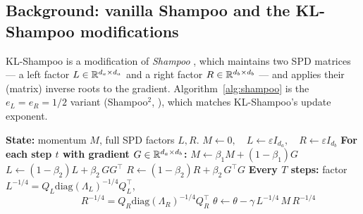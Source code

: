\subsection{Background: vanilla Shampoo and the KL-Shampoo modifications}
\label{sec:shampoo-background}

KL-Shampoo is a modification of \emph{Shampoo} \citep{gupta2018shampoo}, which
maintains two SPD matrices --- a left factor $L\in\mathbb{R}^{d_a\times d_a}$ and a
right factor $R\in\mathbb{R}^{d_b\times d_b}$ --- and applies their (matrix) inverse
roots to the gradient.  Algorithm~\ref{alg:shampoo} is the
$e_L\!=\!e_R\!=\!1/2$ variant (Shampoo$^2$, \citealp{morwani2024new}), which
matches KL-Shampoo's update exponent.

\begin{algorithm}[t]
\caption{Shampoo$^2$ \citep{gupta2018shampoo,morwani2024new} for
$W\in\R^{d_a\times d_b}$.}
\label{alg:shampoo}
\begin{algorithmic}[1]
  \Statex \textbf{State:} momentum $M$, full SPD factors $L,R$.
  \State $M\gets 0,\quad L\gets\varepsilon I_{d_a},\quad R\gets\varepsilon I_{d_b}$
  \Statex
  \State \textbf{For each step $t$ with gradient $G\in\mathbb{R}^{d_a\times d_b}$:}
  \State \quad $M\gets\beta_1 M + (1-\beta_1)G$
  \State \quad $L\gets(1-\beta_2)L + \beta_2\,G G^\top$
  \State \quad $R\gets(1-\beta_2)R + \beta_2\,G^\top G$
  \State \quad \textbf{Every $T$ steps:} factor
         $L^{-1/4}\!=Q_L\mathrm{diag}(\Lambda_L)^{-1/4}Q_L^\top$,\\
         $\phantom{\textbf{Every $T$ steps:}}\;$
         $R^{-1/4}\!=Q_R\mathrm{diag}(\Lambda_R)^{-1/4}Q_R^\top$
  \State \quad $\theta\gets\theta - \gamma\,L^{-1/4}\,M\,R^{-1/4}$
\end{algorithmic}
\end{algorithm}

